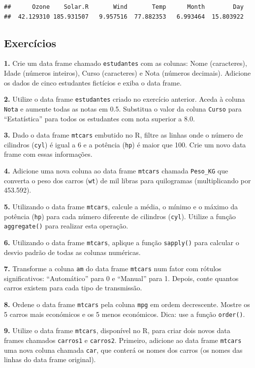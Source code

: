 \documentclass[
]{book}
\begin{document}
\begin{verbatim}
##      Ozone    Solar.R       Wind       Temp      Month        Day 
##  42.129310 185.931507   9.957516  77.882353   6.993464  15.803922
\end{verbatim}

\subsection{Exercícios}\label{exercuxedcios-4}

\textbf{1.} Crie um data frame chamado \texttt{estudantes} com as colunas: Nome
(caracteres), Idade (números inteiros), Curso (caracteres) e Nota
(números decimais). Adicione os dados de cinco estudantes fictícios e
exiba o data frame.

\textbf{2.} Utilize o data frame \texttt{estudantes} criado no exercício anterior.
Aceda à coluna \texttt{Nota} e aumente todas as notas em 0.5. Substitua o valor
da coluna \texttt{Curso} para ``Estatística'' para todos os estudantes com nota
superior a 8.0.

\textbf{3.} Dado o data frame \texttt{mtcars} embutido no R, filtre as linhas onde o
número de cilindros (\texttt{cyl}) é igual a 6 e a potência (\texttt{hp}) é maior que
100. Crie um novo data frame com essas informações.

\textbf{4.} Adicione uma nova coluna ao data frame \texttt{mtcars} chamada \texttt{Peso\_KG}
que converta o peso dos carros (\texttt{wt}) de mil libras para quilogramas
(multiplicando por 453.592).

\textbf{5.} Utilizando o data frame \texttt{mtcars}, calcule a média, o mínimo e o
máximo da potência (\texttt{hp}) para cada número diferente de cilindros
(\texttt{cyl}). Utilize a função \texttt{aggregate()} para realizar esta operação.

\textbf{6.} Utilizando o data frame \texttt{mtcars}, aplique a função \texttt{sapply()}
para calcular o desvio padrão de todas as colunas numéricas.

\textbf{7.} Transforme a coluna \texttt{am} do data frame \texttt{mtcars} num fator com
rótulos significativos: ``Automático'' para 0 e ``Manual'' para 1. Depois,
conte quantos carros existem para cada tipo de transmissão.

\textbf{8.} Ordene o data frame \texttt{mtcars} pela coluna \texttt{mpg} em ordem
decrescente. Mostre os 5 carros mais económicos e os 5 menos económicos. Dica: use a função \texttt{order()}.

\textbf{9.} Utilize o data frame \texttt{mtcars}, disponível no R, para criar dois novos data frames chamados \texttt{carros1} e \texttt{carros2}. Primeiro, adicione ao data frame \texttt{mtcars} uma nova coluna chamada \texttt{car}, que conterá os nomes dos carros (os nomes das linhas do data frame original).
\end{document}
